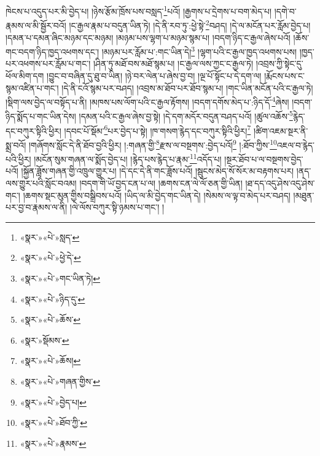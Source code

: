 \documentclass[12pt,a4paper]{book}
\begin{document}
ཁེངས་པ་འདུད་པར་མི་བྱེད་པ། །ཉེས་རྩོམ་ཁྲོས་པས་བསླད་\footnote{«སྣར་»«པེ་»སླད་}པའོ། །རྒྱགས་པ་དྲེགས་པ་བག་མེད་པ། །དགེ་བ་རྣམས་ལ་མི་སྦྱོར་བའོ། །ང་རྒྱལ་རྣམ་པ་བདུན་ཡིན་ཏེ། །དེ་ནི་རབ་ཏུ་:ཕྱེ་སྟེ་\footnote{«སྣར་»«པེ་»ཕྱེ་དེ་}བཤད། །དེ་ལ་མངོན་པར་རློམ་བྱེད་པ། །དམན་པ་དམན་ཞིང་མཉམ་དང་མཉམ། །མཉམ་པས་ལྷག་པ་མཉམ་སྙམ་པ། །བདག་ཉིད་ང་རྒྱལ་ཞེས་པའོ། །ཆོས་གང་བདག་ཉིད་ཁྱད་འཕགས་དང་། །མཉམ་པར་རློམ་པ་:གང་ཡིན་དེ།\footnote{«སྣར་»«པེ་»གང་ཡིན་ཏེ།} །ལྷག་པའི་ང་རྒྱལ་ཁྱད་འཕགས་པས། །ཁྱད་པར་འཕགས་པར་རློམ་པ་གང་། །ཤིན་ཏུ་མཐོ་བས་མཐོ་སྙམ་པ། །ང་རྒྱལ་ལས་ཀྱང་ང་རྒྱལ་ཏེ། །འབྲས་ཀྱི་སྟེང་དུ་ཕོལ་མིག་དག །བྱུང་བ་བཞིན་དུ་ཐུ་བ་ཡིན། །ཉེ་བར་ལེན་པ་ཞེས་བྱ་བ། །ལྔ་པོ་སྟོང་པ་དེ་དག་ལ། །རྨོངས་པས་ང་སྙམ་འཛིན་པ་གང་། །དེ་ནི་ངའོ་སྙམ་པར་བཤད། །འབྲས་མ་ཐོབ་པར་ཐོབ་སྙམ་པ། །གང་ཡིན་མངོན་པའི་ང་རྒྱལ་ཏེ། །སྡིག་ལས་བྱེད་ལ་བསྟོད་པ་ནི། །མཁས་པས་ལོག་པའི་ང་རྒྱལ་རྟོགས། །བདག་དགོས་མེད་པ་:ཉིད་དོ་\footnote{«སྣར་»«པེ་»ཉིད་དུ་}ཞེས། །བདག་ཉིད་སྨོད་པ་གང་ཡིན་དེས། །དམན་པའི་ང་རྒྱལ་ཞེས་བྱ་སྟེ། །དེ་དག་མདོར་བདུན་བཤད་པའོ། །ཚུལ་འཆོས་\footnote{«སྣར་»«པེ་»ཆོས་}རྙེད་དང་བཀུར་སྟིའི་ཕྱིར། །དབང་པོ་སྡོམ་\footnote{«སྣར་»སྡོམས་}པར་བྱེད་པ་སྟེ། །ཁ་གསག་རྙེད་དང་བཀུར་སྟིའི་ཕྱིར།\footnote{«སྣར་»«པེ་»ཆོས།} །ཚིག་འཇམ་སྔར་ནི་སྨྲ་བའོ། །གཞོགས་སློང་དེ་ནི་ཐོབ་བྱའི་ཕྱིར། །:གཞན་གྱི་\footnote{«སྣར་»«པེ་»གཞན་གྱིས་}རྫས་ལ་བསྔགས་:བྱེད་པའོ།\footnote{«སྣར་»«པེ་»བྱེད་པ།} །:ཐོབ་ཀྱིས་\footnote{«སྣར་»«པེ་»ཐོབ་ཀྱི་}འཇལ་བ་རྙེད་པའི་ཕྱིར། །མངོན་སུམ་གཞན་ལ་སྨོད་བྱེད་པ། །རྙེད་པས་རྙེད་པ་རྣམ་\footnote{«སྣར་»«པེ་»རྣམས་}འདོད་པ། །སྔར་ཐོབ་པ་ལ་བསྔགས་བྱེད་པའོ། །སྐྱོན་ཟློས་གཞན་གྱི་འཁྲུལ་གྱུར་པ། །དེ་དང་དེ་ནི་གང་ཟློས་པའོ། །སྦུངས་མེད་སོ་སོར་མ་བརྟགས་པར། །ནད་ལས་གྱུར་པའི་སློང་བའམ། །བདག་གི་ཡོ་བྱད་ངན་པ་ལ། །ཆགས་ངན་ལེ་ལོ་ཅན་གྱི་ཡིན། །ཐ་དད་འདུ་ཤེས་འདུ་ཤེས་གང་། །ཆགས་སྡང་མུན་གྱིས་བསྒྲིབས་པའོ། །ཡིད་ལ་མི་བྱེད་གང་ཡིན་དེ། །སེམས་ལ་ལྟ་བ་མེད་པར་བཤད། །མཐུན་པར་བྱ་བ་རྣམས་ལ་ནི། །ལེ་ལོས་བཀུར་སྟི་ཉམས་པ་གང་། །
\end{document}
